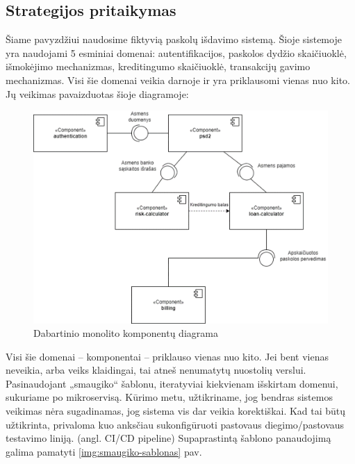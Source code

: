 \documentclass[fleqn]{VUMIFPSkursinis}
\begin{document}
\subsection{Strategijos pritaikymas}
Šiame pavyzdžiui naudosime fiktyvią paskolų išdavimo sistemą. Šioje sistemoje yra naudojami 5 esminiai domenai: autentifikacijos, paskolos dydžio skaičiuoklė, išmokėjimo mechanizmas, kreditingumo skaičiuoklė, transakcijų gavimo mechanizmas. Visi šie domenai veikia darnoje ir yra priklausomi vienas nuo kito. Jų veikimas pavaizduotas šioje diagramoje:
\begin{figure}[H]
    \centering
    \includegraphics[scale=1.0]{img/komponentu-diagrama.png}
    \caption{Dabartinio monolito komponentų diagrama}
    \label{img:komponentu-diagrama}
\end{figure}

Visi šie domenai – komponentai – priklauso vienas nuo kito. Jei bent vienas neveikia, arba veiks klaidingai, tai atneš nenumatytų nuostolių verslui. Pasinaudojant „smaugiko“ šablonu, iteratyviai kiekvienam išskirtam domenui, sukuriame po mikroservisą. Kūrimo metu, užtikriname, jog bendras sistemos veikimas nėra sugadinamas, jog sistema vis dar veikia korektiškai. Kad tai būtų užtikrinta, privaloma kuo anksčiau sukonfigūruoti pastovaus diegimo/pastovaus testavimo liniją. (angl. CI/CD pipeline)  Supaprastintą šablono panaudojimą galima pamatyti \ref{img:smaugiko-sablonas} pav.
\end{document}

